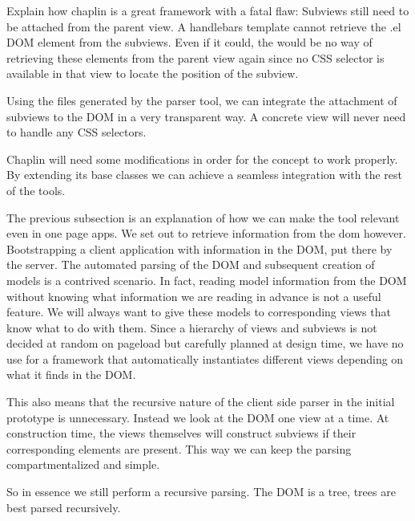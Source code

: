 


Explain how chaplin is a great framework with a fatal flaw: Subviews still need
to be attached from the parent view. A handlebars template cannot retrieve the
.el DOM element from the subviews. Even if it could, the would be no way of
retrieving these elements from the parent view again since no CSS selector is
available in that view to locate the position of the subview.

Using the files generated by the parser tool, we can integrate the attachment of
subviews to the DOM in a very transparent way. A concrete view will never need
to handle any CSS selectors.

Chaplin will need some modifications in order for the concept to work properly.
By extending its base classes we can achieve a seamless integration with the
rest of the tools.


The previous subsection is an explanation of how we can make the tool relevant
even in one page apps. We set out to retrieve information from the dom however.
Bootstrapping a client application with information in the DOM, put there by the
server.
The automated parsing of the DOM and subsequent creation of models is a
contrived scenario. In fact, reading model information from the DOM without
knowing what information we are reading in advance is not a useful feature.
We will always want to give these models to corresponding views that know what
to do with them. Since a hierarchy of views and subviews is not decided at
random on pageload but carefully planned at design time, we have no use for a
framework that automatically instantiates different views depending on what it
finds in the DOM.

This also means that the recursive nature of the client side parser in the
initial prototype is unnecessary. Instead we look at the DOM one view at a
time. At construction time, the views themselves will construct subviews if
their corresponding elements are present. This way we can keep the parsing
compartmentalized and simple.

So in essence we still perform a recursive parsing. The DOM is a tree, trees
are best parsed recursively.


